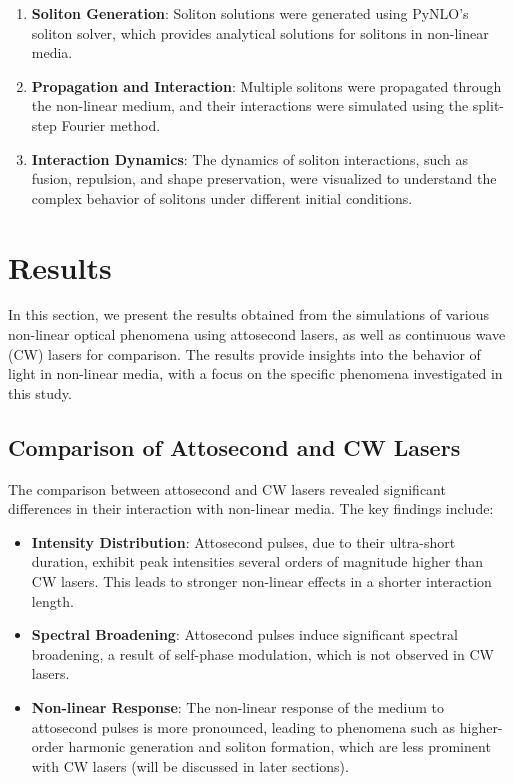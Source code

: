 \documentclass[12pt]{article}
\begin{document}
\begin{enumerate}
    \item \textbf{Soliton Generation}: Soliton solutions were generated using PyNLO's soliton solver, which provides analytical solutions for solitons in non-linear media.
    \item \textbf{Propagation and Interaction}: Multiple solitons were propagated through the non-linear medium, and their interactions were simulated using the split-step Fourier method.
    \item \textbf{Interaction Dynamics}: The dynamics of soliton interactions, such as fusion, repulsion, and shape preservation, were visualized to understand the complex behavior of solitons under different initial conditions.
\end{enumerate}

\newpage

\section{Results}\label{sec:results}

In this section, we present the results obtained from the simulations of various non-linear optical phenomena using attosecond lasers, as well as continuous wave (CW) lasers for comparison. The results provide insights into the behavior of light in non-linear media, with a focus on the specific phenomena investigated in this study.

\subsection{Comparison of Attosecond and CW Lasers}

The comparison between attosecond and CW lasers revealed significant differences in their interaction with non-linear media. The key findings include:

\begin{itemize}
    \item \textbf{Intensity Distribution}: Attosecond pulses, due to their ultra-short duration, exhibit peak intensities several orders of magnitude higher than CW lasers. This leads to stronger non-linear effects in a shorter interaction length.
    \item \textbf{Spectral Broadening}: Attosecond pulses induce significant spectral broadening, a result of self-phase modulation, which is not observed in CW lasers.
    \item \textbf{Non-linear Response}: The non-linear response of the medium to attosecond pulses is more pronounced, leading to phenomena such as higher-order harmonic generation and soliton formation, which are less prominent with CW lasers (will be discussed in later sections).
\end{itemize}
\end{document}
